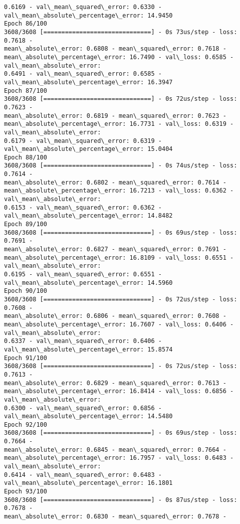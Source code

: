\documentclass[11pt]{article}
\begin{document}
\begin{Verbatim}[commandchars=\\\{\},fontsize=\footnotesize]
0.6169 - val\_mean\_squared\_error: 0.6330 - val\_mean\_absolute\_percentage\_error: 14.9450
Epoch 86/100
3608/3608 [==============================] - 0s 73us/step - loss: 0.7618 -
mean\_absolute\_error: 0.6808 - mean\_squared\_error: 0.7618 -
mean\_absolute\_percentage\_error: 16.7490 - val\_loss: 0.6585 - val\_mean\_absolute\_error:
0.6491 - val\_mean\_squared\_error: 0.6585 - val\_mean\_absolute\_percentage\_error: 16.3947
Epoch 87/100
3608/3608 [==============================] - 0s 72us/step - loss: 0.7623 -
mean\_absolute\_error: 0.6819 - mean\_squared\_error: 0.7623 -
mean\_absolute\_percentage\_error: 16.7731 - val\_loss: 0.6319 - val\_mean\_absolute\_error:
0.6179 - val\_mean\_squared\_error: 0.6319 - val\_mean\_absolute\_percentage\_error: 15.0404
Epoch 88/100
3608/3608 [==============================] - 0s 74us/step - loss: 0.7614 -
mean\_absolute\_error: 0.6802 - mean\_squared\_error: 0.7614 -
mean\_absolute\_percentage\_error: 16.7213 - val\_loss: 0.6362 - val\_mean\_absolute\_error:
0.6153 - val\_mean\_squared\_error: 0.6362 - val\_mean\_absolute\_percentage\_error: 14.8482
Epoch 89/100
3608/3608 [==============================] - 0s 69us/step - loss: 0.7691 -
mean\_absolute\_error: 0.6827 - mean\_squared\_error: 0.7691 -
mean\_absolute\_percentage\_error: 16.8109 - val\_loss: 0.6551 - val\_mean\_absolute\_error:
0.6195 - val\_mean\_squared\_error: 0.6551 - val\_mean\_absolute\_percentage\_error: 14.5960
Epoch 90/100
3608/3608 [==============================] - 0s 72us/step - loss: 0.7608 -
mean\_absolute\_error: 0.6806 - mean\_squared\_error: 0.7608 -
mean\_absolute\_percentage\_error: 16.7607 - val\_loss: 0.6406 - val\_mean\_absolute\_error:
0.6337 - val\_mean\_squared\_error: 0.6406 - val\_mean\_absolute\_percentage\_error: 15.8574
Epoch 91/100
3608/3608 [==============================] - 0s 72us/step - loss: 0.7613 -
mean\_absolute\_error: 0.6829 - mean\_squared\_error: 0.7613 -
mean\_absolute\_percentage\_error: 16.8414 - val\_loss: 0.6856 - val\_mean\_absolute\_error:
0.6300 - val\_mean\_squared\_error: 0.6856 - val\_mean\_absolute\_percentage\_error: 14.5480
Epoch 92/100
3608/3608 [==============================] - 0s 69us/step - loss: 0.7664 -
mean\_absolute\_error: 0.6845 - mean\_squared\_error: 0.7664 -
mean\_absolute\_percentage\_error: 16.7957 - val\_loss: 0.6483 - val\_mean\_absolute\_error:
0.6414 - val\_mean\_squared\_error: 0.6483 - val\_mean\_absolute\_percentage\_error: 16.1801
Epoch 93/100
3608/3608 [==============================] - 0s 87us/step - loss: 0.7678 -
mean\_absolute\_error: 0.6830 - mean\_squared\_error: 0.7678 -

\end{Verbatim}
\end{document}
